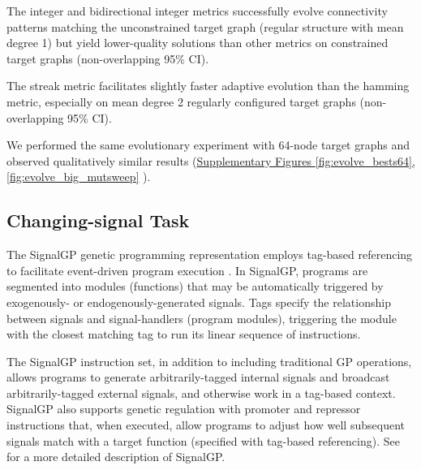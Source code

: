 The integer and bidirectional integer metrics successfully evolve connectivity patterns matching the unconstrained target graph (regular structure with mean degree 1) but yield lower-quality solutions than other metrics on constrained target graphs (non-overlapping 95\% CI).

The streak metric facilitates slightly faster adaptive evolution than the hamming metric, especially on mean degree 2 regularly configured target graphs (non-overlapping 95\% CI).

We performed the same evolutionary experiment with 64-node target graphs and observed qualitatively similar results (\href{doi.org/10.17605/OSF.IO/GW5MC}{Supplementary Figures \ref{fig:evolve_bests64}, \ref{fig:evolve_big_mutsweep}} \cite{Moreno_Ofria_2020}).

\subsection{Changing-signal Task}




The SignalGP genetic programming representation employs tag-based referencing to facilitate event-driven program execution \citep{lalejini2018evolving}.
In SignalGP, programs are segmented into modules (functions) that may be automatically triggered by exogenously- or endogenously-generated signals.
Tags specify the relationship between signals and signal-handlers (program modules), triggering the module with the closest matching tag to run its linear sequence of instructions.

The SignalGP instruction set, in addition to including traditional GP operations, allows programs to generate arbitrarily-tagged internal signals and broadcast arbitrarily-tagged external signals, and otherwise work in a tag-based context.
SignalGP also supports genetic regulation with promoter and repressor instructions that, when executed, allow programs to adjust how well subsequent signals match with a target function (specified with tag-based referencing). %
See \citep{lalejini2018evolving} for a more detailed description of SignalGP.

